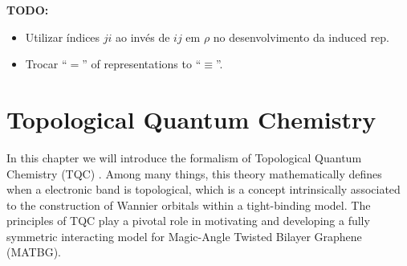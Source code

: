 


\textbf{TODO:}
\begin{itemize}
\item Utilizar índices $ji$ ao invés de $ij$ em $\rho$ no desenvolvimento da induced rep.
\item Trocar ``$=$'' of representations to ``$\equiv$''.
\end{itemize}


\chapter{Topological Quantum Chemistry}

In this chapter we will introduce the formalism of Topological Quantum Chemistry (TQC) \cite{topological_quantum_chemistry2017, building_blocks2018, lectures_tms2017}. Among many things, this theory mathematically defines when a electronic band is topological, which is a concept intrinsically associated to the construction of Wannier orbitals within a tight-binding model. The principles of TQC play a pivotal role in motivating and developing a fully symmetric interacting model for Magic-Angle Twisted Bilayer Graphene (MATBG).


